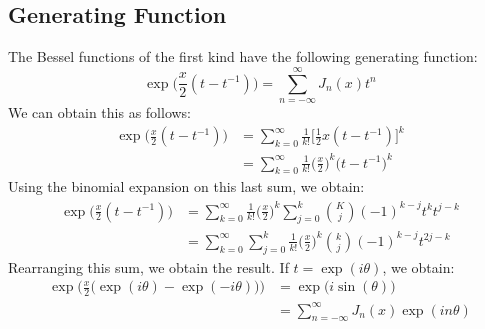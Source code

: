 \documentclass[crop=false,class=book,oneside]{standalone}
\begin{document}
        \subsection{Generating Function}
            The Bessel functions of the first kind have the
            following generating function:
            \begin{equation}
                \exp\Big(\frac{x}{2}(t-t^{\minus{1}})\Big)
                =\sum_{n=\minus\infty}^{\infty}
                    J_{n}(x)t^{n}
            \end{equation}
            We can obtain this as follows:
            \begin{subequations}
                \begin{align}
                    \exp\Big(\frac{x}{2}(t-t^{\minus{1}})\Big)
                    &=\sum_{k=0}^{\infty}\frac{1}{k!}
                    \Big[\frac{1}{2}x(t-t^{\minus{1}})\Big]^{k}\\
                    &=\sum_{k=0}^{\infty}\frac{1}{k!}
                        \Big(\frac{x}{2}\Big)^{k}
                        \Big(t-t^{\minus{1}}\Big)^{k}
                \end{align}
            \end{subequations}
            Using the binomial expansion on this last sum, we
            obtain:
            \begin{subequations}
                \begin{align}
                    \exp\Big(\frac{x}{2}(t-t^{\minus{1}})\Big)
                    &=\sum_{k=0}^{\infty}\frac{1}{k!}
                        \Big(\frac{x}{2}\Big)^{k}
                        \sum_{j=0}^{k}\binom{K}{j}
                        (\minus{1})^{k-j}t^{k}t^{j-k}\\
                    &=\sum_{k=0}^{\infty}\sum_{j=0}^{k}
                        \frac{1}{k!}\Big(\frac{x}{2}\Big)^{k}
                        \binom{k}{j}(\minus{1})^{k-j}t^{2j-k}
                \end{align}
            \end{subequations}
            Rearranging this sum, we obtain the result. If
            $t=\exp(i\theta)$, we obtain:
            \begin{align}
                \exp\Big(\frac{x}{2}\big(
                    \exp(i\theta)-\exp(\minus{i}\theta)\big)\Big)
                &=\exp\big(i\sin(\theta)\big)\\
                &=\sum_{n=\minus\infty}^{\infty}
                    J_{n}(x)\exp(in\theta)
            \end{align}
\end{document}
